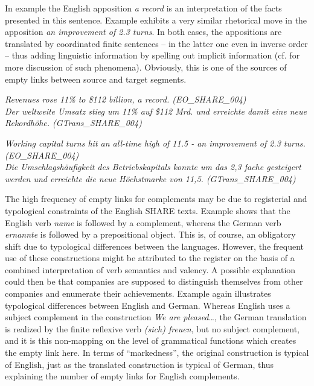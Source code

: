 \documentclass[output=paper]{LSP/langsci}
\begin{document}
\newpage 
In example  the English apposition \textit{a record} is an interpretation of the facts presented in this sentence. Example  exhibits a very similar rhetorical move in the apposition \textit{an improvement of 2.3 turns}. In both cases, the appositions are translated by coordinated finite sentences -- in the latter one even in inverse order -- thus adding linguistic information by spelling out implicit information (cf. \citealt{Hansen-SchirraEtAl2007} for more discussion of such phenomena). Obviously, this is one of the sources of empty links between source and target segments.

\ea\label{ex:culo:2}
   \ea 
    \textit{Revenues rose 11\% to \$112 billion, a record. \textup{(EO\_SHARE\_004)}}\\
    \ex \textit{Der weltweite Umsatz stieg um 11\% auf \$112 Mrd. und erreichte damit eine neue Rekordhöhe. \textup{(GTrans\_SHARE\_004)}} 
   \z
\z


\ea \label{ex:culo:3} 
   \ea \textit{Working capital turns hit an all-time high of 11.5 - an improvement of 2.3 turns. \textup{(EO\_SHARE\_004)}} \\
    \ex \textit{Die Umschlagshäufigkeit des Betriebskapitals konnte um das 2,3 fache gesteigert   werden und erreichte die neue Höchstmarke von 11,5. \textup{(GTrans\_SHARE\_004)}}
     \z
\z


The high frequency of empty links for complements may be due to registerial and typological constraints of the English SHARE texts. Example  shows that the English verb \textit{name} is followed by a complement, whereas the German verb \textit{ernannte} is followed by a prepositional object. This is, of course, an obligatory shift due to typological differences between the languages. However, the frequent use of these constructions might be attributed to the register on the basis of a combined interpretation of verb semantics and valency. A possible explanation could then be that companies are supposed to distinguish themselves from other companies and enumerate their achievements. Example  again illustrates typological differences between English and German. Whereas English uses a subject complement in the construction \textit{We are pleased}\ldots, the German translation is realized by the finite reflexive verb \textit{(sich) freuen}, but no subject complement, and it is this non-mapping on the level of grammatical functions which creates the empty link here. In terms of ``markedness'', the original construction is typical of English, just as the translated construction is typical of German, thus explaining the number of empty links for English complements.
\end{document}
